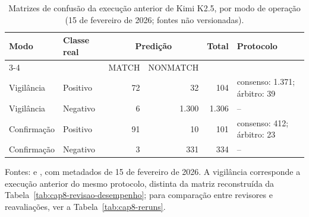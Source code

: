 \begin{table}[htbp]
\centering
\caption{Matrizes de confusão da execução anterior de Kimi K2.5, por modo de operação (15 de fevereiro de 2026; fontes não versionadas).}
\label{tab:qw2-confusion}
\small
\begin{tabular}{llrrrl}
\toprule
Modo & Classe real & \multicolumn{2}{c}{Predi\c{c}\~ao} & Total & Protocolo \\
\cmidrule(lr){3-4}
 & & MATCH & NONMATCH & & \\
\midrule
Vigil\^ancia & Positivo & 72 & 32 & 104 & consenso: 1.371; \'arbitro: 39 \\
Vigil\^ancia & Negativo & 6 & 1.300 & 1.306 & -- \\
\midrule
Confirma\c{c}\~ao & Positivo & 91 & 10 & 101 & consenso: 412; \'arbitro: 23 \\
Confirma\c{c}\~ao & Negativo & 3 & 331 & 334 & -- \\
\bottomrule
\end{tabular}
\par\smallskip
\parbox{\linewidth}{\footnotesize Fontes:  e , com metadados de 15 de fevereiro de 2026. A vigilância corresponde a execução anterior do mesmo protocolo, distinta da matriz reconstruída da Tabela~\ref{tab:cap8-revisao-desempenho}; para comparação entre revisores e reavaliações, ver a Tabela~\ref{tab:cap8-reruns}.}
\end{table}
